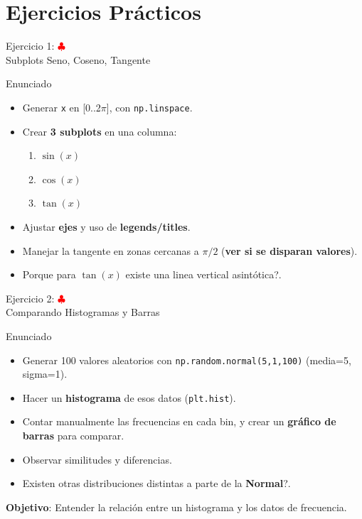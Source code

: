 \documentclass[10pt]{beamer}
\begin{document}
\section{Ejercicios Prácticos}

\begin{frame}{Ejercicio 1: \hfill \textcolor{red}{$\clubsuit$} \\ Subplots Seno, Coseno, Tangente}
  \begin{block}{Enunciado}
    \begin{itemize}
      \item Generar \texttt{x} en [0..2\(\pi\)], con \texttt{np.linspace}.
      \item Crear \textbf{3 subplots} en una columna:
        \begin{enumerate}
          \item \(\sin(x)\)
          \item \(\cos(x)\)
          \item \(\tan(x)\)
        \end{enumerate}
      \item Ajustar \textbf{ejes} y uso de \textbf{legends/titles}.
      \item Manejar la tangente en zonas cercanas a \(\pi/2\) (\textbf{ver si se disparan valores}).
      \item Porque para \(\tan(x)\) existe una linea vertical asintótica?.
    \end{itemize}
  \end{block}
\end{frame}

\begin{frame}{Ejercicio 2: \hfill \textcolor{red}{$\clubsuit$} \\ Comparando Histogramas y Barras  }
  \begin{block}{Enunciado}
    \begin{itemize}
      \item Generar 100 valores aleatorios con \texttt{np.random.normal(5,1,100)} (media=5, sigma=1).
      \item Hacer un \textbf{histograma} de esos datos (\texttt{plt.hist}).
      \item Contar manualmente las frecuencias en cada bin, y crear un \textbf{gráfico de barras} para comparar.
      \item Observar similitudes y diferencias.
      \item Existen otras distribuciones distintas a parte de la \textbf{Normal}?.
    \end{itemize}
  \end{block}
  \textbf{Objetivo}: Entender la relación entre un histograma y los datos de frecuencia.
\end{frame}
\end{document}
